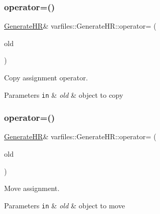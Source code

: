 \subsubsection{\texorpdfstring{operator=()}{operator=()}\hspace{0.1cm}{\footnotesize\ttfamily [1/2]}}
{\footnotesize\ttfamily \hyperlink{classvarfiles_1_1_generate_h_r}{Generate\+HR}\& varfiles\+::\+Generate\+H\+R\+::operator= (\begin{DoxyParamCaption}\item[{const \hyperlink{classvarfiles_1_1_generate_h_r}{Generate\+HR} \&}]{old }\end{DoxyParamCaption})\hspace{0.3cm}{\ttfamily [default]}}



Copy assignment operator. 


\begin{DoxyParams}[1]{Parameters}
\mbox{\tt in}  & {\em old} & object to copy \\
\hline
\end{DoxyParams}
\mbox{\label{classvarfiles_1_1_generate_h_r_a0478ceb0f776cbdeb4fa9c2f66e70002}} 
\subsubsection{\texorpdfstring{operator=()}{operator=()}\hspace{0.1cm}{\footnotesize\ttfamily [2/2]}}
{\footnotesize\ttfamily \hyperlink{classvarfiles_1_1_generate_h_r}{Generate\+HR}\& varfiles\+::\+Generate\+H\+R\+::operator= (\begin{DoxyParamCaption}\item[{\hyperlink{classvarfiles_1_1_generate_h_r}{Generate\+HR} \&\&}]{old }\end{DoxyParamCaption})\hspace{0.3cm}{\ttfamily [default]}}



Move assignment. 


\begin{DoxyParams}[1]{Parameters}
\mbox{\tt in}  & {\em old} & object to move \\
\hline
\end{DoxyParams}
\mbox{\label{classvarfiles_1_1_generate_h_r_ac0c560c9ea17bc67470124040e0bd796}} 
